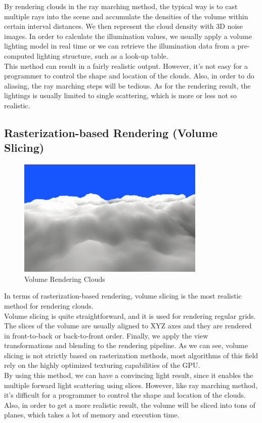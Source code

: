 By rendering clouds in the ray marching method, the typical way is to cast multiple rays into the scene and accumulate the densities of the volume within certain interval distances. We then represent the cloud density with 3D noise images. In order to calculate the illumination values, we usually apply a volume lighting model in real time or we can retrieve the illumination data from a pre-computed lighting structure, such as a look-up table.\\
This method can result in a fairly realistic output. However, it's not easy for a programmer to control the shape and location of the clouds. Also, in order to do aliasing, the ray marching steps will be tedious. As for the rendering result, the lightings is usually limited to single scattering, which is more or less not so realistic.

\subsection{Rasterization-based Rendering (Volume Slicing)}
\begin{figure}[htp]
\begin{center}
\includegraphics[scale=1.0]{images/volumerendering.png}
\caption{Volume Rendering Clouds}
\label{f4}
\end{center}
\end{figure}

In terms of rasterization-based rendering, volume slicing is the most realistic method for rendering clouds.\\
Volume slicing is quite straightforward, and it is used for rendering regular grids. The slices of the volume are usually aligned to XYZ axes and they are rendered in front-to-back or back-to-front order. Finally, we apply the view transformations and blending to the rendering pipeline. As we can see, volume slicing is not strictly based on rasterization methods, most algorithms of this field rely on the highly optimized texturing capabilities of the GPU.\\
By using this method, we can have a convincing light result, since it enables the multiple forward light scattering using slices. However, like ray marching method, it's difficult for a programmer to control the shape and location of the clouds. Also, in order to get a more realistic result, the volume will be sliced into tons of planes, which takes a lot of memory and execution time.
